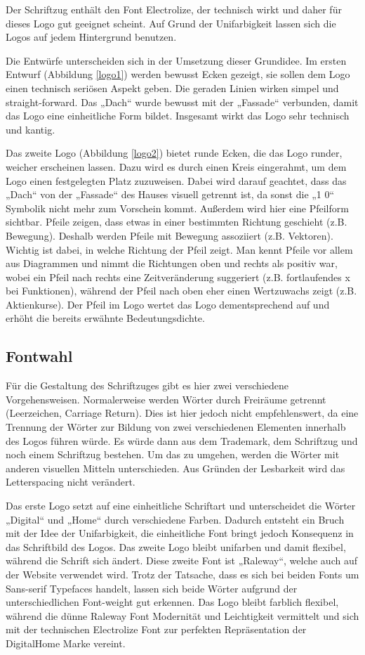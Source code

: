Der Schriftzug enthält den Font Electrolize, der technisch wirkt und daher für dieses Logo gut geeignet scheint. Auf Grund der Unifarbigkeit lassen sich die Logos auf jedem Hintergrund benutzen.


Die Entwürfe unterscheiden sich in der Umsetzung dieser Grundidee. Im ersten Entwurf (Abbildung \ref{logo1}) werden bewusst Ecken gezeigt, sie sollen dem Logo einen technisch seriösen Aspekt geben. Die geraden Linien wirken simpel und straight-forward. Das „Dach“ wurde bewusst mit der „Fassade“ verbunden, damit das Logo eine einheitliche Form bildet. Insgesamt wirkt das Logo sehr technisch und kantig.


Das zweite Logo (Abbildung \ref{logo2}) bietet runde Ecken, die das Logo runder, weicher erscheinen lassen. Dazu wird es durch einen Kreis eingerahmt, um dem Logo einen festgelegten Platz zuzuweisen. Dabei wird darauf geachtet, dass das „Dach“ von der „Fassade“ des Hauses visuell getrennt ist, da sonst die „1 0“ Symbolik nicht mehr zum Vorschein kommt. Außerdem wird hier eine Pfeilform sichtbar. Pfeile zeigen, dass etwas in einer bestimmten Richtung geschieht (z.B. Bewegung). Deshalb werden Pfeile mit Bewegung assoziiert (z.B. Vektoren). Wichtig ist dabei, in welche Richtung der Pfeil zeigt. Man kennt Pfeile vor allem aus Diagrammen und nimmt die Richtungen oben und rechts als positiv war, wobei ein Pfeil nach rechts eine Zeitveränderung suggeriert (z.B. fortlaufendes x bei Funktionen), während der Pfeil nach oben eher einen Wertzuwachs zeigt (z.B. Aktienkurse). Der Pfeil im Logo wertet das Logo dementsprechend auf und erhöht die bereits erwähnte Bedeutungsdichte.

\subsection{Fontwahl}
Für die Gestaltung des Schriftzuges gibt es hier zwei verschiedene Vorgehensweisen. Normalerweise werden Wörter durch Freiräume getrennt (Leerzeichen, Carriage Return). Dies ist hier jedoch nicht empfehlenswert, da eine Trennung der Wörter zur Bildung von zwei verschiedenen Elementen innerhalb des Logos führen würde. Es würde dann aus dem Trademark, dem Schriftzug und noch einem Schriftzug bestehen. Um das zu umgehen, werden die Wörter mit anderen visuellen Mitteln unterschieden. Aus Gründen der Lesbarkeit wird das Letterspacing nicht verändert.

Das erste Logo setzt auf eine einheitliche Schriftart und unterscheidet die Wörter „Digital“ und „Home“ durch verschiedene Farben. Dadurch entsteht ein Bruch mit der Idee der Unifarbigkeit, die einheitliche Font bringt jedoch Konsequenz in das Schriftbild des Logos.
Das zweite Logo bleibt unifarben und damit flexibel, während die Schrift sich ändert. Diese zweite Font ist „Raleway“, welche auch auf der Website verwendet wird. Trotz der Tatsache, dass es sich bei beiden Fonts um Sans-serif Typefaces handelt, lassen sich beide Wörter aufgrund der unterschiedlichen Font-weight gut erkennen. Das Logo bleibt farblich flexibel, während die dünne Raleway Font Modernität und Leichtigkeit vermittelt und sich mit der technischen Electrolize Font zur perfekten Repräsentation der DigitalHome Marke vereint.
